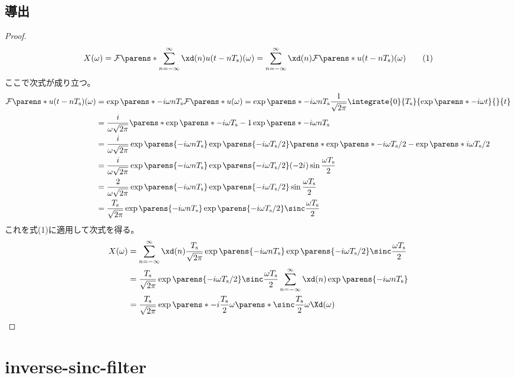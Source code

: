        \subsection{導出}
            \begin{proof}
                \quad\par
                \[ X(\omega) = \FT{\sum_{n=-\infty}^\infty \xd(n)u(t-n\Ts)}(\omega) = \sum_{n=-\infty}^\infty \xd(n)\FT{u(t-n\Ts)}(\omega) \tag{1} \]
                ここで次式が成り立つ。
                \begin{align*}
                    \FT{u(t-n\Ts)}(\omega) &= \exp\parens*{-i \omega n\Ts}\FT{u}(\omega) = \exp\parens*{-i \omega n\Ts}\frac{1}{\sqrt{2\pi}}\integrate{0}{\Ts}{\exp\parens*{-i\omega t}}{}{t} \\
                    &= \frac{i}{\omega\sqrt{2\pi}}\parens*{\exp\parens*{-i \omega\Ts}-1}\exp\parens*{-i \omega n\Ts} \\
                    &= \frac{i}{\omega\sqrt{2\pi}}\exp\parens{-i \omega n\Ts}\exp\parens{-i \omega\Ts/2}\parens*{\exp\parens*{-i \omega\Ts/2} - \exp\parens*{i \omega\Ts/2}} \\
                    &= \frac{i}{\omega\sqrt{2\pi}}\exp\parens{-i \omega n\Ts}\exp\parens{-i \omega\Ts/2}(-2i)\sin\frac{\omega\Ts}{2} \\
                    &= \frac{2}{\omega\sqrt{2\pi}}\exp\parens{-i \omega n\Ts}\exp\parens{-i \omega\Ts/2}\sin\frac{\omega\Ts}{2} \\
                    &= \frac{\Ts}{\sqrt{2\pi}}\exp\parens{-i \omega n\Ts}\exp\parens{-i \omega\Ts/2}\sinc\frac{\omega\Ts}{2}
                \end{align*}
                これを式(1)に適用して次式を得る。
                \begin{align*}
                    X(\omega) &= \sum_{n=-\infty}^\infty \xd(n)\frac{\Ts}{\sqrt{2\pi}}\exp\parens{-i \omega n\Ts}\exp\parens{-i \omega\Ts/2}\sinc\frac{\omega\Ts}{2} \\
                    &= \frac{\Ts}{\sqrt{2\pi}}\exp\parens{-i \omega\Ts/2}\sinc\frac{\omega\Ts}{2} \sum_{n=-\infty}^\infty \xd(n)\exp\parens{-i \omega n\Ts} \\
                    &= \frac{\Ts}{\sqrt{2\pi}}\exp\parens*{-i\frac{\Ts}{2}\omega}\parens*{\sinc \frac{\Ts}{2}\omega}\Xd(\omega)
                \end{align*}
            \end{proof}
    \section{inverse-sinc-filter}
